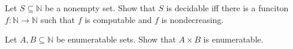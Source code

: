 \documentclass[addpoints]{exam}
\begin{document}
  \pagestyle{headandfoot}
  \runningheadrule

  \firstpagefooter{}{}{}
  \runningfooter{}{}{}
  \begin{flushright}

    \vspace{0.2in}
  \end{flushright}

  \begin{questions}
    \question[10]
      Let $S \subseteq \mathbb{N}$ be a nonempty set.
			Show that $S$ is decidable iff there is a funciton $f : \mathbb{N} \to \mathbb{N}$ such that $f$ is computable and $f$ is nondecreasing.

      \begin{solution}[\stretch{1}]
      \end{solution}
      \newpage
    \question[10]
      Let $A, B \subseteq \mathbb{N}$ be enumeratable sets.
			Show that $A \times B$ is enumeratable.

      \begin{solution}[\stretch{1}]
      \end{solution}
      \newpage
  \end{questions}
\end{document}

